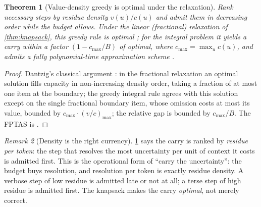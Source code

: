 \documentclass[11pt,twocolumn,a4paper]{article}
\theoremstyle{thmstyle}
\newtheorem{theorem}{Theorem}[section]
\theoremstyle{definition}
\theoremstyle{remark}
\newtheorem{remark}[theorem]{Remark}
\newcommand{\budget}{B}
\newcommand{\val}{v}                    %
\newcommand{\cost}{c}                   %
\begin{document}
\begin{theorem}[Value-density greedy is optimal under the relaxation]
\label{thm:greedy}
Rank necessary steps by \emph{residue density} $\val(u)/\cost(u)$ and admit them
in decreasing order while the budget allows. Under the linear (fractional)
relaxation of \cref{thm:knapsack}, this greedy rule is optimal
\citep{dantzig1957}; for the integral problem it yields a carry within a factor
$(1-\cost_{\max}/\budget)$ of optimal, where $\cost_{\max}=\max_u\cost(u)$, and
admits a fully polynomial-time approximation scheme \citep{sahni1975}.
\end{theorem}

\begin{proof}
Dantzig's classical argument \citep{dantzig1957}: in the fractional relaxation an
optimal solution fills capacity in non-increasing density order, taking a
fraction of at most one item at the boundary; the greedy integral rule agrees
with this solution except on the single fractional boundary item, whose omission
costs at most its value, bounded by $\cost_{\max}\cdot(\val/\cost)_{\max}$; the
relative gap is bounded by $\cost_{\max}/\budget$. The FPTAS is \citet{sahni1975}.
\end{proof}

\begin{remark}[Density is the right currency]
\label{rem:density}
\cref{thm:greedy} says the carry is ranked by \emph{residue per token}: the step
that resolves the most uncertainty per unit of context it costs is admitted
first. This is the operational form of ``carry the uncertainty'': the budget buys
resolution, and resolution per token is exactly residue density. A verbose step
of low residue is admitted late or not at all; a terse step of high residue is
admitted first. The knapsack makes the carry \emph{optimal}, not merely correct.
\end{remark}
\end{document}
